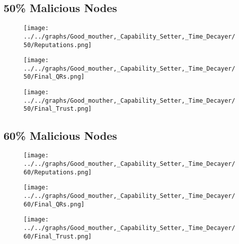 \begin{minipage}[t]{0.49\columnwidth}
\subsection*{50\% Malicious Nodes}
    \begin{figure}[H]
        \centering
        \texttt{[image: ../../graphs/Good\_mouther,\_Capability\_Setter,\_Time\_Decayer/50/Reputations.png]}
    \end{figure}
    \begin{figure}[H]
        \centering
        \texttt{[image: ../../graphs/Good\_mouther,\_Capability\_Setter,\_Time\_Decayer/50/Final\_QRs.png]}
    \end{figure}
\end{minipage}
\begin{minipage}[t]{0.49\columnwidth}
    \begin{figure}[H]
        \centering
        \texttt{[image: ../../graphs/Good\_mouther,\_Capability\_Setter,\_Time\_Decayer/50/Final\_Trust.png]}
    \end{figure}
\end{minipage}

\begin{minipage}[t]{0.49\columnwidth}
\subsection*{60\% Malicious Nodes}
    \begin{figure}[H]
        \centering
        \texttt{[image: ../../graphs/Good\_mouther,\_Capability\_Setter,\_Time\_Decayer/60/Reputations.png]}
    \end{figure}
    \begin{figure}[H]
        \centering
        \texttt{[image: ../../graphs/Good\_mouther,\_Capability\_Setter,\_Time\_Decayer/60/Final\_QRs.png]}
    \end{figure}
\end{minipage}
\begin{minipage}[t]{0.49\columnwidth}
    \begin{figure}[H]
        \centering
        \texttt{[image: ../../graphs/Good\_mouther,\_Capability\_Setter,\_Time\_Decayer/60/Final\_Trust.png]}
    \end{figure}
\end{minipage}


